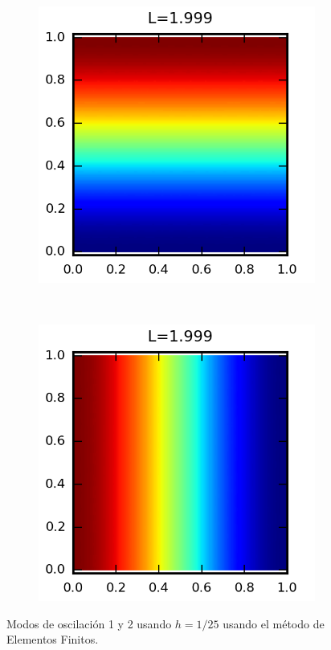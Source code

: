 \begin{figure}
  \centering
  \begin{subfigure}{0.3\textwidth}
    \includegraphics{figuras/modonum_1.png}
  \end{subfigure}
  ~
  \begin{subfigure}{0.3\textwidth}
    \includegraphics{figuras/modonum_2.png}
  \end{subfigure}
  
  \caption{Modos de oscilaci\'on 1 y 2 usando $h=1/25$ usando el m\'etodo de Elementos Finitos.}
\end{figure}

